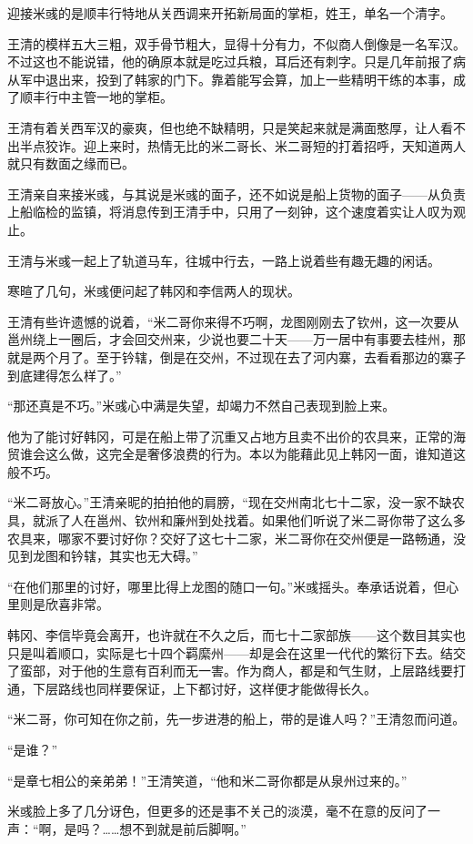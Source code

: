 迎接米彧的是顺丰行特地从关西调来开拓新局面的掌柜，姓王，单名一个清字。

王清的模样五大三粗，双手骨节粗大，显得十分有力，不似商人倒像是一名军汉。不过这也不能说错，他的确原本就是吃过兵粮，耳后还有刺字。只是几年前报了病从军中退出来，投到了韩家的门下。靠着能写会算，加上一些精明干练的本事，成了顺丰行中主管一地的掌柜。

王清有着关西军汉的豪爽，但也绝不缺精明，只是笑起来就是满面憨厚，让人看不出半点狡诈。迎上来时，热情无比的米二哥长、米二哥短的打着招呼，天知道两人就只有数面之缘而已。

王清亲自来接米彧，与其说是米彧的面子，还不如说是船上货物的面子——从负责上船临检的监镇，将消息传到王清手中，只用了一刻钟，这个速度着实让人叹为观止。

王清与米彧一起上了轨道马车，往城中行去，一路上说着些有趣无趣的闲话。

寒暄了几句，米彧便问起了韩冈和李信两人的现状。

王清有些许遗憾的说着，“米二哥你来得不巧啊，龙图刚刚去了钦州，这一次要从邕州绕上一圈后，才会回交州来，少说也要二十天——万一居中有事要去桂州，那就是两个月了。至于钤辖，倒是在交州，不过现在去了河内寨，去看看那边的寨子到底建得怎么样了。”

“那还真是不巧。”米彧心中满是失望，却竭力不然自己表现到脸上来。

他为了能讨好韩冈，可是在船上带了沉重又占地方且卖不出价的农具来，正常的海贸谁会这么做，这完全是奢侈浪费的行为。本以为能藉此见上韩冈一面，谁知道这般不巧。

“米二哥放心。”王清亲昵的拍拍他的肩膀，“现在交州南北七十二家，没一家不缺农具，就派了人在邕州、钦州和廉州到处找着。如果他们听说了米二哥你带了这么多农具来，哪家不要讨好你？交好了这七十二家，米二哥你在交州便是一路畅通，没见到龙图和钤辖，其实也无大碍。”

“在他们那里的讨好，哪里比得上龙图的随口一句。”米彧摇头。奉承话说着，但心里则是欣喜非常。

韩冈、李信毕竟会离开，也许就在不久之后，而七十二家部族——这个数目其实也只是叫着顺口，实际是七十四个羁縻州——却是会在这里一代代的繁衍下去。结交了蛮部，对于他的生意有百利而无一害。作为商人，都是和气生财，上层路线要打通，下层路线也同样要保证，上下都讨好，这样便才能做得长久。

“米二哥，你可知在你之前，先一步进港的船上，带的是谁人吗？”王清忽而问道。

“是谁？”

“是章七相公的亲弟弟！”王清笑道，“他和米二哥你都是从泉州过来的。”

米彧脸上多了几分讶色，但更多的还是事不关己的淡漠，毫不在意的反问了一声：“啊，是吗？……想不到就是前后脚啊。”


